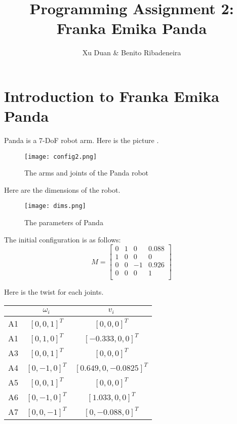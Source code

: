 \documentclass[english,10pt,a4paper]{article}
\author{Xu Duan \& Benito Ribadeneira}
\title{Programming Assignment 2: Franka Emika Panda }
\begin{document}
    \maketitle
    \section{Introduction to Franka Emika Panda}
    Panda is a 7-DoF robot arm. Here is the picture \cite{franka_emika_2017}.
    \begin{figure}[H]\label{joints}
        \texttt{[image: config2.png]}
        \caption{The arms and joints of the Panda robot}
    \end{figure}

    Here are the dimensions of the robot.
    \begin{figure}[H]\label{dims}
        \texttt{[image: dims.png]}
        \caption{The parameters of Panda}
    \end{figure}
	
    The initial configuration is as follows:
    $$M = \begin{bmatrix}
        0 & 1 & 0 & 0.088\\
        1 & 0 & 0 & 0\\
        0 & 0 & -1 & 0.926 \\
        0 & 0 & 0 & 1 \\
    \end{bmatrix}$$
    
    Here is the twist for each joints.
    \begin{center}
        \begin{tabular}{|c|c|c|}
            \hline
            & $\omega_i$ & $v_i$ \\
            \hline
            A1 & $[0, 0, 1]^{T}$ & $[0, 0, 0]^{T}$ \\
            \hline
            A1 & $[0, 1, 0]^{T}$ & $[-0.333, 0, 0]^{T}$ \\
            \hline
            A3 & $[0, 0, 1]^{T}$ & $[0, 0, 0]^{T}$ \\
            \hline
            A4 & $[0, -1, 0]^{T}$ & $[0.649, 0, -0.0825]^{T}$ \\
            \hline
            A5 & $[0, 0, 1]^{T}$ & $[0, 0, 0]^{T}$ \\
            \hline
            A6 & $[0, -1, 0]^{T}$ & $[1.033, 0, 0]^{T}$ \\
            \hline
            A7 & $[0, 0, -1]^{T}$ & $[0, -0.088, 0]^{T}$ \\
            \hline
        \end{tabular}
    \end{center}
    
\end{document}
